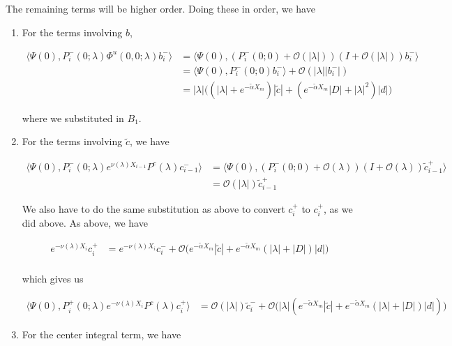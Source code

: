 \documentclass[12pt]{article}
\begin{document}
The remaining terms will be higher order. Doing these in order, we have

\begin{enumerate}
\item For the terms involving $b$,

\begin{align*}
\langle \Psi(0), P_i^-(0; \lambda) \Phi^u(0, 0; \lambda) b_i^- \rangle
&= \langle \Psi(0), (P_i^-(0; 0) + \mathcal{O}(|\lambda|))(I + \mathcal{O}(|\lambda|)) b_i^- \rangle \\
&= \langle \Psi(0), P_i^-(0; 0) b_i^- \rangle + \mathcal{O}(|\lambda||b_i^-|) \\
&= |\lambda| \Big(
(|\lambda| + e^{-\tilde{\alpha}X_m})|\tilde{c}|
+ (e^{-\tilde{\alpha}X_m}|D| 
+ |\lambda|^2)|d|
\Big)
\end{align*}

where we substituted in $B_1$.

\item For the terms involving $\tilde{c}$, we have

\begin{align*}
\langle \Psi(0), P_i^-(0; \lambda)e^{\nu(\lambda) X_{i-1}} P^c(\lambda) c_{i-1}^-\rangle &= 
\langle \Psi(0), (P_i^-(0; 0) + \mathcal{O}(\lambda))(I + \mathcal{O}(\lambda)) \tilde{c}_{i-1}^+ \rangle \\
&= \mathcal{O}(|\lambda|) \tilde{c}_{i-1}^+
\end{align*}

We also have to do the same substitution as above to convert $c_i^+$ to $c_i^+$, as we did above. As above, we have

\begin{align*}
e^{-\nu(\lambda)X_i} c_i^+ &= e^{-\nu(\lambda)X_i} c_i^- + \mathcal{O}\Big( e^{-\tilde{\alpha} X_m} |\tilde{c}| + e^{-\tilde{\alpha} X_m}(|\lambda| + |D| ) |d| \Big) \\
\end{align*}

which gives us

\begin{align*}
\langle \Psi(0), P_i^+(0; \lambda)e^{-\nu(\lambda) X_i} P^c(\lambda) c_i^+ \rangle 
&= \mathcal{O}(|\lambda|) \tilde{c}_i^- + \mathcal{O}\Big( |\lambda|( e^{-\tilde{\alpha} X_m} |\tilde{c}| + e^{-\tilde{\alpha} X_m}(|\lambda| + |D| ) |d| ) \Big)
\end{align*}

\item For the center integral term, we have


\end{enumerate}
\end{document}
